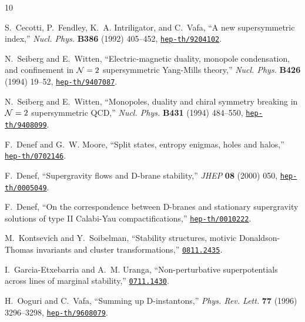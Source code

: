 \begin{thebibliography}{10}

S.~Cecotti, P.~Fendley, K.~A. Intriligator, and C.~Vafa, ``A new supersymmetric
  index,'' {\em Nucl. Phys.} {\bf B386} (1992) 405--452,
\href{http://www.arXiv.org/abs/hep-th/9204102}{{\tt hep-th/9204102}}.

N.~Seiberg and E.~Witten, ``Electric-magnetic duality, monopole condensation,
  and confinement in {$\mathcal{N}=2$} supersymmetric {Y}ang-{M}ills theory,'' {\em
  Nucl. Phys.} {\bf B426} (1994) 19--52,
\href{http://www.arXiv.org/abs/hep-th/9407087}{{\tt hep-th/9407087}}.

N.~Seiberg and E.~Witten, ``Monopoles, duality and chiral symmetry breaking in
  {$\mathcal{N}=2$} supersymmetric {Q}{C}{D},'' {\em Nucl. Phys.} {\bf B431} (1994)
  484--550,
\href{http://www.arXiv.org/abs/hep-th/9408099}{{\tt hep-th/9408099}}.

F.~Denef and G.~W. Moore, ``Split states, entropy enigmas, holes and halos,''
\href{http://www.arXiv.org/abs/hep-th/0702146}{{\tt hep-th/0702146}}.

F.~Denef, ``{Supergravity flows and D-brane stability},'' {\em JHEP} {\bf 08}
  (2000) 050,
\href{http://www.arXiv.org/abs/hep-th/0005049}{{\tt hep-th/0005049}}.

F.~Denef, ``{On the correspondence between D-branes and stationary supergravity
  solutions of type II Calabi-Yau compactifications},''
\href{http://www.arXiv.org/abs/hep-th/0010222}{{\tt hep-th/0010222}}.

M.~Kontsevich and Y.~Soibelman, ``{S}tability structures, motivic
  {D}onaldson-{T}homas invariants and cluster transformations,''
  \href{http://www.arXiv.org/abs/0811.2435}{{\tt 0811.2435}}.

I.~Garcia-Etxebarria and A.~M. Uranga, ``Non-perturbative superpotentials
  across lines of marginal stability,''
\href{http://www.arXiv.org/abs/0711.1430}{{\tt 0711.1430}}.

H.~Ooguri and C.~Vafa, ``{S}umming up {D}-instantons,'' {\em Phys. Rev. Lett.}
  {\bf 77} (1996) 3296--3298,
\href{http://www.arXiv.org/abs/hep-th/9608079}{{\tt hep-th/9608079}}.


\end{thebibliography}
